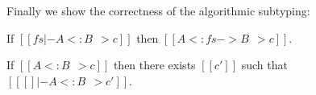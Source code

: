 Finally we show the correctness of the algorithmic subtyping:

\begin{theorem}[Soundness]
  If $[[ fs |- A <: B ~~> c]]$ then $ [[   A <: fs -> B ~~> c  ]]   $.
\end{theorem}

\begin{theorem}[Completeness]
  If $[[A <: B ~~> c]]$ then there exists $[[c']]$ such that $[[ [] |- A <: B ~~> c']]$.
\end{theorem}




